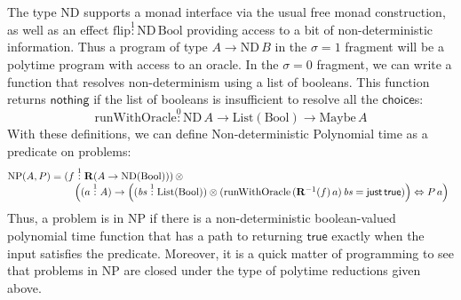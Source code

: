 \documentclass[acmsmall,screen]{acmart}
\newcommand{\BoolTy}{\mathrm{Bool}}
\newcommand{\cTrue}{\mathsf{true}}
\newcommand{\cFalse}{\mathsf{false}}
\newcommand{\ListTy}{\mathrm{List}}
\newcommand{\cNil}{\mathsf{nil}}
\begin{document}
The type $\mathrm{ND}$ supports a monad interface via the usual free
monad construction, as well as an effect
$\mathrm{flip} \stackrel1: \mathrm{ND}\,\BoolTy$ providing access to a
bit of non-deterministic information. Thus a program of type
$A \to \mathrm{ND}\,B$ in the $\sigma = 1$ fragment will be a polytime
program with access to an oracle. In the $\sigma = 0$ fragment, we can
write a function that resolves non-determinism using a list of
booleans. This function returns $\mathsf{nothing}$ if the list of
booleans is insufficient to resolve all the $\mathsf{choice}$s:
\begin{displaymath}
  \mathrm{runWithOracle} \stackrel0: \mathrm{ND}\,A \to \ListTy(\BoolTy) \to \mathrm{Maybe}\,A
\end{displaymath}
With these definitions, we can define Non-deterministic Polynomial
time as a predicate on problems:
\begin{displaymath}
  \mathrm{NP}(A,P) =
  \begin{array}[t]{@{}l}
    (f \stackrel1: \mathbf{R}(A \to \mathrm{ND}(\BoolTy)))\, \otimes \\
    \quad \left((a \stackrel1: A) \to \left((\mathit{bs} \stackrel1: \ListTy(\BoolTy)) \otimes (\mathrm{runWithOracle}\,(\mathbf{R}^{-1}(f)\,a)\,\mathit{bs} = \mathsf{just}\,\cTrue)\right) \Leftrightarrow P\,a\right)
  \end{array}
\end{displaymath}
Thus, a problem is in NP if there is a non-deterministic
boolean-valued polynomial time function that has a path to returning
$\cTrue$ exactly when the input satisfies the predicate. Moreover, it is a
quick matter of programming to see that problems in NP are closed
under the type of polytime reductions given above.

\end{document}
